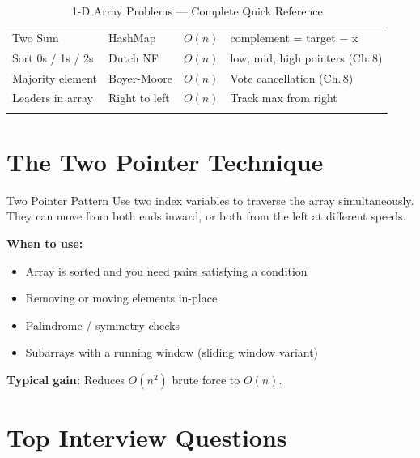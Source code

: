 \documentclass[12pt,a4paper,oneside]{book}
\begin{document}
\begin{longtable}{p{4.3cm}p{2.9cm}p{2.0cm}p{4.1cm}}
Two Sum                  & HashMap          & $O(n)$        & complement = target $-$ x\\
Sort 0s / 1s / 2s        & Dutch NF         & $O(n)$        & low, mid, high pointers (Ch.\,8)\\
Majority element         & Boyer-Moore      & $O(n)$        & Vote cancellation (Ch.\,8)\\
Leaders in array         & Right to left    & $O(n)$        & Track max from right\\
\bottomrule
\caption{1-D Array Problems --- Complete Quick Reference}
\end{longtable}

\section{The Two Pointer Technique}

\begin{definitionbox}{Two Pointer Pattern}
Use two index variables to traverse the array simultaneously. They can move from both ends inward, or both from the left at different speeds.

\textbf{When to use:}
\begin{itemize}
  \item Array is sorted and you need pairs satisfying a condition
  \item Removing or moving elements in-place
  \item Palindrome / symmetry checks
  \item Subarrays with a running window (sliding window variant)
\end{itemize}
\textbf{Typical gain:} Reduces $O(n^2)$ brute force to $O(n)$.
\end{definitionbox}

\section{Top Interview Questions}
\end{document}
